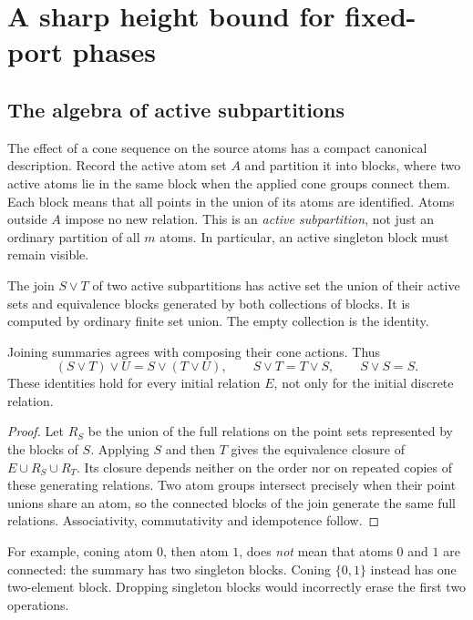\section{A sharp height bound for fixed-port phases}
\label{sec:height}

\subsection{The algebra of active subpartitions}

The effect of a cone sequence on the source atoms has a compact canonical
description. Record the active atom set $A$ and partition it into blocks,
where two active atoms lie in the same block when the applied cone groups
connect them. Each block means that all points in the union of its atoms
are identified. Atoms outside $A$ impose no new relation. This is an
\emph{active subpartition}, not just an ordinary partition of all $m$ atoms.
In particular, an active singleton block must remain visible.

The join $S\vee T$ of two active subpartitions has active set the union of
their active sets and equivalence blocks generated by both collections of
blocks. It is computed by ordinary finite set union. The empty collection
is the identity.

\begin{lemma}
\label{lem:semilattice}
Joining summaries agrees with composing their cone actions. Thus
\[
 (S\vee T)\vee U=S\vee(T\vee U),\qquad
 S\vee T=T\vee S,\qquad S\vee S=S.
\]
These identities hold for every initial relation $E$, not only for the
initial discrete relation.
\end{lemma}

\begin{proof}
Let $R_S$ be the union of the full relations on the point sets represented
by the blocks of $S$. Applying $S$ and then $T$ gives the equivalence
closure of $E\cup R_S\cup R_T$. Its closure depends neither on the order
nor on repeated copies of these generating relations. Two atom groups
intersect precisely when their point unions share an atom, so the connected
blocks of the join generate the same full relations. Associativity,
commutativity and idempotence follow.
\end{proof}

For example, coning atom $0$, then atom $1$, does \emph{not} mean that atoms
$0$ and $1$ are connected: the summary has two singleton blocks. Coning
$\{0,1\}$ instead has one two-element block. Dropping singleton blocks
would incorrectly erase the first two operations.

